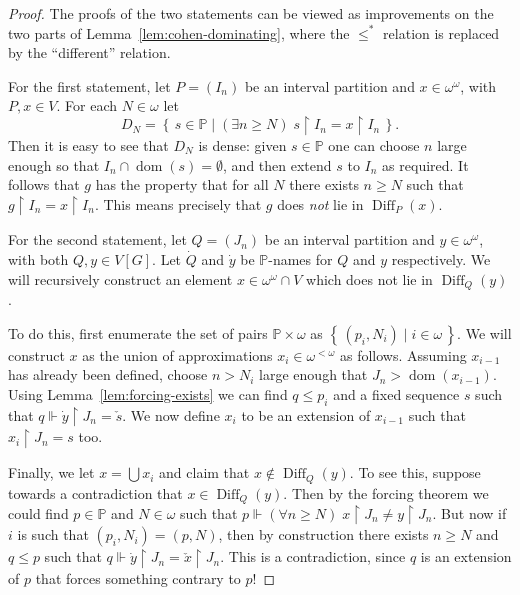 \documentclass[11pt,oneside]{amsbook}
\newcommand{\set}[1]{\left\{\,#1\,\right\}}
\newcommand{\PP}{\mathbb P}
\newcommand{\forces}{\Vdash}
\DeclareMathOperator{\dom}{dom}
\DeclareMathOperator{\Diff}{Diff}
\theoremstyle{definition}
\theoremstyle{plain}
\theoremstyle{definition}
\theoremstyle{remark}
\numberwithin{equation}{section}
\numberwithin{figure}{section}
\begin{document}
\begin{proof}
  The proofs of the two statements can be viewed as improvements on the two parts of Lemma~\ref{lem:cohen-dominating}, where the $\leq^*$ relation is replaced by the ``different'' relation.

  For the first statement, let $P=(I_n)$ be an interval partition and $x\in\omega^\omega$, with $P,x\in V$. For each $N\in\omega$ let
  \[D_N=\set{s\in\PP\mid(\exists n\geq N)\;s\restriction I_n=x\restriction I_n}\text{.}
  \]
  Then it is easy to see that $D_N$ is dense: given $s\in\PP$ one can choose $n$ large enough so that $I_n\cap\dom(s)=\emptyset$, and then extend $s$ to $I_n$ as required. It follows that $g$ has the property that for all $N$ there exists $n\geq N$ such that $g\restriction I_n=x\restriction I_n$. This means precisely that $g$ does \emph{not} lie in $\Diff_P(x)$.

  For the second statement, let $Q=(J_n)$ be an interval partition and $y\in\omega^\omega$, with both $Q,y\in V[G]$. Let $\dot Q$ and $\dot y$ be $\PP$-names for $Q$ and $y$ respectively. We will recursively construct an element $x\in\omega^\omega\cap V$ which does not lie in $\Diff_Q(y)$.

  To do this, first enumerate the set of pairs $\PP\times\omega$ as $\set{(p_i,N_i)\mid i\in\omega}$. We will construct $x$ as the union of approximations $x_i\in\omega^{<\omega}$ as follows. Assuming $x_{i-1}$ has already been defined, choose $n>N_i$ large enough that $J_n>\dom(x_{i-1})$. Using Lemma~\ref{lem:forcing-exists} we can find $q\leq p_i$ and a fixed sequence $s$ such that $q\forces \dot y\restriction J_n=\check s$. We now define $x_i$ to be an extension of $x_{i-1}$ such that $x_i\restriction J_n=s$ too.

  Finally, we let $x=\bigcup x_i$ and claim that $x\notin\Diff_Q(y)$. To see this, suppose towards a contradiction that $x\in\Diff_Q(y)$. Then by the forcing theorem we could find $p\in\PP$ and $N\in\omega$ such that $p\forces(\forall n\geq N)\;x\restriction J_n\neq y\restriction J_n$. But now if $i$ is such that $(p_i,N_i)=(p,N)$, then by construction there exists $n\geq N$ and $q\leq p$ such that $q\forces\dot y\restriction J_n=\check x\restriction J_n$. This is a contradiction, since $q$ is an extension of $p$ that forces something contrary to $p$!
\end{proof}

\end{document}
